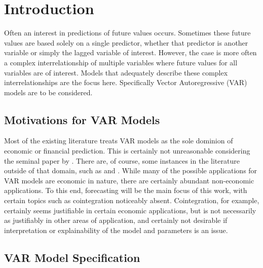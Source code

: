 
\chapter{Introduction}

Often an interest in predictions of future values occurs. Sometimes
these future values are based solely on a single predictor, whether
that predictor is another variable or simply the lagged variable of
interest. However, the case is more often a complex interrelationship
of multiple variables where future values for all variables are of
interest. Models that adequately describe these complex interrelationships
are the focus here. Specifically Vector Autoregressive (VAR) models
are to be considered.


\section{Motivations for VAR Models}

Most of the existing literature treats VAR models as the sole dominion
of economic or financial prediction. This is certainly not unreasonable
considering the seminal paper by \citet{Sims:1980}. There are, of
course, some instances in the literature outside of that domain, such
as \citet{Cres:Ente:1999} and \citet{Free:Will:Lin:1989}. While
many of the possible applications for VAR models are economic in nature,
there are certainly abundant non-economic applications. To this end,
forecasting will be the main focus of this work, with certain topics
such as cointegration noticeably absent. Cointegration, for example,
certainly seems justifiable in certain economic applications, but
is not necessarily as justifiably in other areas of application, and
certainly not desirable if interpretation or explainability of the
model and parameters is an issue.


\section{VAR Model Specification}

